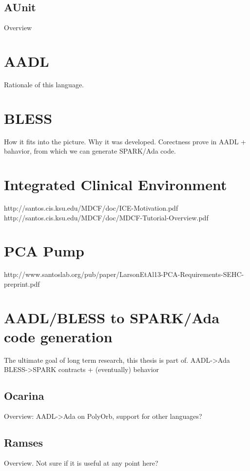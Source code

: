 \subsection{AUnit}
\label{background:spark:aunit}
Overview


\section{AADL}
\label{background:aadl}
Rationale of this language.


\section{BLESS}
\label{background:bless}
How it fits into the picture. Why it was developed. Corectness prove in AADL + bahavior, from which we can generate SPARK/Ada code.


\section{Integrated Clinical Environment}
\label{background:ice}
http://santos.cis.ksu.edu/MDCF/doc/ICE-Motivation.pdf
http://santos.cis.ksu.edu/MDCF/doc/MDCF-Tutorial-Overview.pdf


\section{PCA Pump}
\label{background:pcapump}
http://www.santoslab.org/pub/paper/LarsonEtAl13-PCA-Requirements-SEHC-preprint.pdf


\section{AADL/BLESS to SPARK/Ada code generation}
\label{background:codegen}
The ultimate goal of long term research, this thesis is part of.
AADL->Ada
BLESS->SPARK contracts + (eventually) behavior

\subsection{Ocarina}
\label{background:codegen:ocarina}
Overview: AADL->Ada on PolyOrb, support for other languages?

\subsection{Ramses}
\label{background:codegen:ramses}
Overview. Not sure if it is useful at any point here?